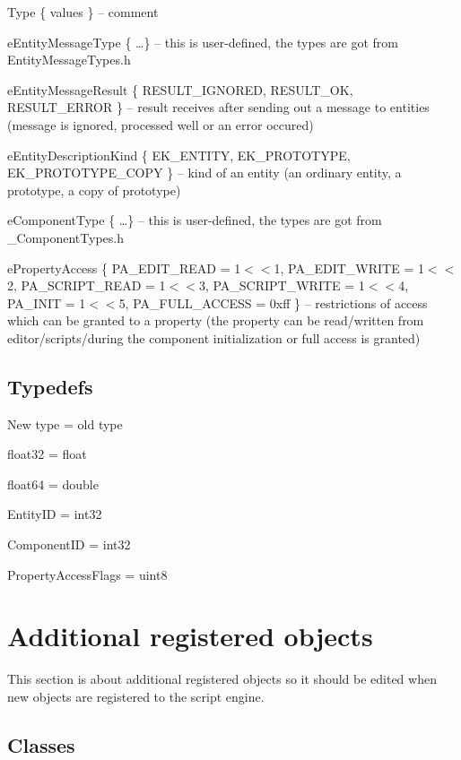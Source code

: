 \documentclass[12pt, a4paper]{article}
\newenvironment{titled-itemize}[1]
{
\vspace{5mm}
\noindent\textbf{#1}
\begin{itemize}
}
{
\end{itemize}
}
\begin{document}
\begin{titled-itemize}{Type \{ values \} -- comment}
  \item eEntityMessageType \{ \ldots \} -- this is user-defined, the types are got from EntityMessageTypes.h
  \item eEntityMessageResult \{ RESULT\_IGNORED, RESULT\_OK, RE\-SULT\-\_\-ER\-ROR \} -- result receives after sending out a message to entities (message is ignored, processed well or an error occured)
  \item eEntityDescriptionKind \{ EK\_ENTITY, EK\_PROTOTYPE, EK\-\_\-PRO\-TO\-TY\-PE\-\_\-CO\-PY \} -- kind of an entity (an ordinary entity, a prototype, a copy of prototype)
  \item eComponentType \{ \ldots \} -- this is user-defined, the types are got from \_ComponentTypes.h 
  \item ePropertyAccess \{ PA\_EDIT\_READ = 1$<<$1, PA\_EDIT\_WRITE = 1$<<$2, PA\_SCRIPT\_READ = 1$<<$3, PA\_SCRIPT\_WRITE = 1$<<$4, PA\_INIT = 1$<<$5, PA\_FULL\_ACCESS = 0xff \} -- restrictions of access which can be granted to a property (the property can be read/written from editor/scripts/during the component initialization or full access is granted)
\end{titled-itemize}

\subsection{Typedefs}

\begin{titled-itemize}{New type = old type}
	\item float32 = float
	\item float64 = double
	\item EntityID = int32
	\item ComponentID = int32
	\item PropertyAccessFlags = uint8
\end{titled-itemize}

\section{Additional registered objects}

This section is about additional registered objects so it should be edited when new objects are registered to the script engine.

\subsection{Classes}
\end{document}
